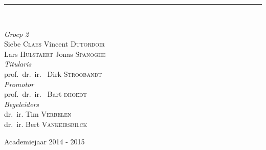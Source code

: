\documentclass[a4paper,11.5pt]{report}
\newcommand{\HRule}{\rule{\linewidth}{0.5mm}}
\begin{document}
\begin{titlepage}
\begin{center}
\begin{figure}[H]
\end{figure}


\HRule \\[1.5cm]

\begin{minipage}{1\textwidth}
\begin{center} \large
\emph{Groep 2}\\
Siebe \textsc{Claes}
Vincent \textsc{Dutordoir}\\
Lars \textsc{Hulstaert}
Jonas \textsc{Spanoghe}\\[0.2cm]
\emph{Titularis}\\
prof.~dr.~ir.~ Dirk \textsc{Stroobandt}\\[0.2cm]
\emph{Promotor}\\
prof.~dr.~ir.~ Bart \textsc{dhoedt}\\[0.2cm]
\emph{Begeleiders}\\
dr.~ir. Tim \textsc{Verbelen}\\
dr.~ir. Bert \textsc{Vankeirsbilck}\\

\end{center}
\end{minipage}

\vfill


\end{center}
{\large Academiejaar 2014 - 2015}
\end{titlepage}

\tableofcontents

% 


%



\end{document}
